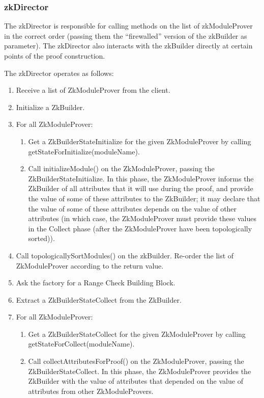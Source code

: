   \subsubsection{zkDirector}
  The zkDirector is responsible for calling methods on the list of zkModuleProver in the correct order (passing them the
  ``firewalled'' version of the zkBuilder as parameter). The zkDirector also interacts with the zkBuilder directly at certain
  points of the proof construction.

  The zkDirector operates as follows:
  \begin{enumerate}
    \item Receive a list of ZkModuleProver from the client.
    \item Initialize a ZkBuilder.
    \item For all ZkModuleProver:
      \begin{enumerate}
        \item Get a ZkBuilderStateInitialize for the given ZkModuleProver by calling getStateForInitialize(moduleName).
        \item Call initializeModule() on the ZkModuleProver, passing the ZkBuilderStateInitialize. In this phase, the ZkModuleProver
          informs the ZkBuilder of all attributes that it will use during the proof, and provide the value of some of these attributes
          to the ZkBuilder; it may declare that the value of some of these attributes depends on the value of other attributes (in which case,
          the ZkModuleProver must provide these values in the Collect phase (after the ZkModuleProver have been topologically sorted)).
      \end{enumerate}
    \item Call topologicallySortModules() on the zkBuilder. Re-order the list of ZkModuleProver according to the return value.
    \item Ask the factory for a Range Check Building Block.
    \item Extract a ZkBuilderStateCollect from the ZkBuilder.
    \item For all ZkModuleProver:
      \begin{enumerate}
        \item Get a ZkBuilderStateCollect for the given ZkModuleProver by calling getStateForCollect(moduleName).
        \item Call collectAttributesForProof() on the ZkModuleProver, passing the ZkBuilderStateCollect. In this phase, the ZkModuleProver
           provides the ZkBuilder with the value of attributes that depended on the value of attributes from other ZkModuleProvers.
      \end{enumerate}


\end{enumerate}
